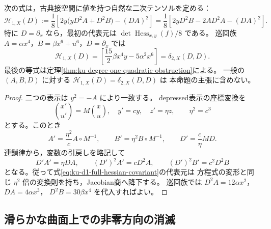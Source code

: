 \begin{proposition}[次数1のHessian共変式]
\label{prop:ku-d1-full-hessian-covariant}
次の式は，古典接空間に値を持つ自然な二次テンソルを定める：
\begin{equation}\label{eq:ku-d1-full-hessian-covariant}
 \mathcal H_{1,X}(D)
 :=\frac18\left[2y\bigl(yD^2A+D^2B\bigr)-(DA)^2\right]
 =\frac18\left[2yD^2B-2A D^2A-(DA)^2\right].
\end{equation}
特に $D=\partial_x$ なら，最初の代表元は
$\det\operatorname{Hess}_{x,y}(f)/8$ である。
巡回族 $A=\alpha x^4$，$B=\beta x^6+u^6$，$D=\partial_x$ では
\[
 \mathcal H_{1,X}(D)
 =\left[\frac{15}{2}\beta x^4y-5\alpha^2x^6\right]
 =\delta_{2,X}(D,D).
\]
最後の等式は定理\ref{thm:ku-degree-one-quadratic-obstruction}による。
一般の $(A,B,D)$ に対する $\mathcal H_{1,X}(D)=\delta_{2,X}(D,D)$ は
本命題の主張に含めない。
\end{proposition}
\begin{proof}
二つの表示は $y^2=-A$ により一致する。
depressed表示の座標変換を
\[
 \binom{x'}{u'}=M\binom{x}{u},\quad y'=cy,\quad z'=\eta z,
 \qquad \eta^2=c^3
\]
とする。このとき
\[
 A'=\frac{\eta^2}{c}A\circ M^{-1},\qquad
 B'=\eta^2B\circ M^{-1},\qquad
 D'=\frac c\eta MD.
\]
連鎖律から，変数の引戻しを略記して
\[
 D'A'=\eta DA,\qquad (D')^2A'=cD^2A,
 \qquad (D')^2B'=c^2D^2B
\]
となる。従って式\eqref{eq:ku-d1-full-hessian-covariant}の代表元は
方程式の変形と同じ $\eta^2$ 倍の変換則を持ち，Jacobian商へ降下する。
巡回族では $D^2A=12\alpha x^2$，$DA=4\alpha x^3$，
$D^2B=30\beta x^4$ を代入すればよい。
\end{proof}

\subsection{滑らかな曲面上での非零方向の消滅}


